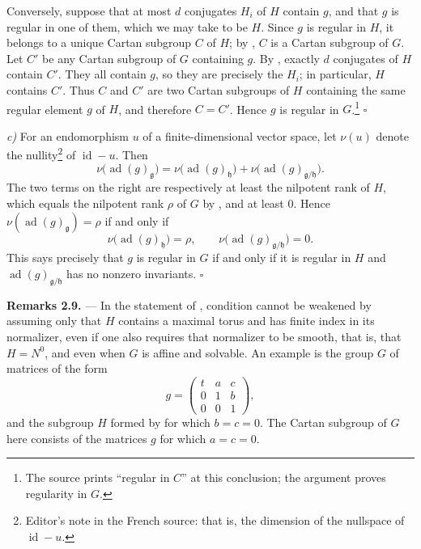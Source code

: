 Conversely, suppose that at most \(d\) conjugates \(H_i\) of \(H\)
contain \(g\), and that \(g\) is regular in one of them, which we may
take to be \(H\). Since \(g\) is regular in \(H\), it belongs to a
unique Cartan subgroup \(C\) of \(H\); by , \(C\) is a Cartan
subgroup of \(G\). Let \(C'\) be any Cartan subgroup of \(G\)
containing \(g\). By , exactly \(d\) conjugates of \(H\)
contain \(C'\). They all contain \(g\), so they are precisely the
\(H_i\); in particular, \(H\) contains \(C'\). Thus \(C\) and \(C'\)
are two Cartan subgroups of \(H\) containing the same regular element
\(g\) of \(H\), and therefore \(C=C'\). Hence \(g\) is regular in
\(G\).\footnote{The source prints ``regular in \(C\)'' at this
conclusion; the argument proves regularity in \(G\).}
\hfill\(\square\)

\textit{c)} For an endomorphism \(u\) of a finite-dimensional vector
space, let \(\nu(u)\) denote the nullity\footnote{Editor's note in the
French source: that is, the dimension of the nullspace of
\(\operatorname{id}-u\).} of \(\operatorname{id}-u\). Then
\[
  \nu\bigl(\operatorname{ad}(g)_{\mathfrak g}\bigr)
  =
  \nu\bigl(\operatorname{ad}(g)_{\mathfrak h}\bigr)
  +
  \nu\bigl(\operatorname{ad}(g)_{\mathfrak g/\mathfrak h}\bigr).
\]
The two terms on the right are respectively at least the nilpotent
rank of \(H\), which equals the nilpotent rank \(\rho\) of \(G\) by
, and at least \(0\). Hence
\(\nu(\operatorname{ad}(g)_{\mathfrak g})=\rho\) if and only if
\[
  \nu\bigl(\operatorname{ad}(g)_{\mathfrak h}\bigr)=\rho,
  \qquad
  \nu\bigl(\operatorname{ad}(g)_{\mathfrak g/\mathfrak h}\bigr)=0.
\]
This says precisely that \(g\) is regular in \(G\) if and only if it
is regular in \(H\) and
\(\operatorname{ad}(g)_{\mathfrak g/\mathfrak h}\) has no nonzero
invariants. \hfill\(\square\)

\medskip
\noindent{}\textbf{Remarks 2.9.} ---
In the statement of , condition  cannot be weakened by
assuming only that \(H\) contains a maximal torus and has finite
index in its normalizer, even if one also requires that normalizer to
be smooth, that is, that \(H=N^0\), and even when \(G\) is affine and
solvable. An example is the group \(G\) of matrices of the form
\[
  g=
  \begin{pmatrix}
    t & a & c\\
    0 & 1 & b\\
    0 & 0 & 1
  \end{pmatrix},
\]
and the subgroup \(H\) formed by  for which
\(b=c=0\). The Cartan subgroup of \(G\) here consists of the matrices
\(g\) for which \(a=c=0\).

